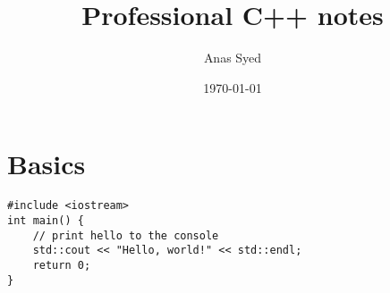\documentclass[a4paper,12pt]{article}
\title{Professional C++ notes}
\date{\today}
\author{Anas Syed}
\begin{document}
\maketitle
\tableofcontents

\section{Basics}

\begin{lstlisting}[numbers=none, caption={C++ code using listings}]
#include <iostream>
int main() {
    // print hello to the console
    std::cout << "Hello, world!" << std::endl;
    return 0;
}
\end{lstlisting}
\end{document}
